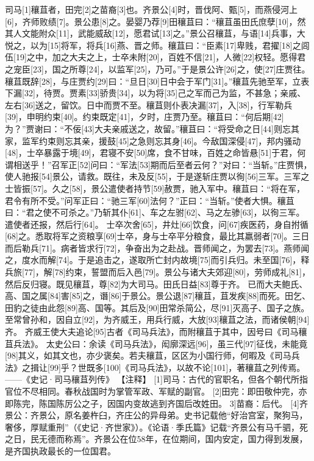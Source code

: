 \documentclass[12pt,UTF8]{ctexbook}
\begin{document}
司马[1]穰苴者，田完[2]之苗裔[3]也。齐景公[4]时，晋伐阿、甄[5]，而燕侵河上[6]，齐师败绩[7]。景公患[8]之。晏婴乃荐[9]田穰苴曰：“穰苴虽田氏庶孽[10]，然其人文能附众[11]，武能威敌[12]，愿君试[13]之。”景公召穰苴，与语[14]兵事，大悦之，以为[15]将军，将兵[16]燕、晋之师。穰苴曰：“臣素[17]卑贱，君擢[18]之闾伍[19]之中，加之大夫之上，士卒未附[20]，百姓不信[21]，人微[22]权轻。愿得君之宠臣[23]，国之所尊[24]，以监军[25]，乃可。”于是景公许[26]之，使[27]庄贾往。
穰苴既辞[28]，与庄贾约[29]曰：“旦日[30]日中会于军门[31]。”穰苴先驰至军，立表下漏[32]，待贾。贾素[33]骄贵[34]，以为将[35]己之军而己为监，不甚急；亲戚、左右[36]送之，留饮。日中而贾不至。穰苴则仆表决漏[37]，入[38]，行军勒兵[39]，申明约束[40]。约束既定[41]，夕时，庄贾乃至。穰苴曰：“何后期[42]为？”贾谢曰：“不佞[43]大夫亲戚送之，故留。”穰苴曰：“将受命之日[44]则忘其家，监军约束则忘其亲，援鼓[45]之急则忘其身[46]。今敌国深侵[47]，邦内骚动[48]，士卒暴露于境[49]，君寝不安[50]席，食不甘味，百姓之命皆悬[51]于君，何谓相送乎！”召军正[52]问曰：“军法[53]期而后至者云何？”对曰：“当斩。”庄贾惧，使人驰报[54]景公，请救。既往，未及反[55]，于是遂斩庄贾以徇[56]三军。三军之士皆振[57]。久之[58]，景公遣使者持节[59]赦贾，驰入军中。穰苴曰：“将在军，君令有所不受。”问军正曰：“驰三军[60]法何？”正曰：“当斩。”使者大惧。穰苴曰：“君之使不可杀之。”乃斩其仆[61]、车之左驸[62]、马之左骖[63]，以徇三军。遣使者还报，然后行[64]。
士卒次舍[65]，井灶[66]饮食，问[67]疾医药，身自拊循[68]之。悉取将军之资粮享[69]士卒，身与士卒平分粮食，最比其羸弱者[70]。三日而后勒兵[71]。病者皆求行[72]，争奋出为之赴战。晋师闻之，为罢去[73]。燕师闻之，度水而解[74]。于是追击之，遂取所亡封内故境[75]而引兵归。未至国[76]，释兵旅[77]，解[78]约束，誓盟而后入邑[79]。景公与诸大夫郊迎[80]，劳师成礼[81]，然后反归寝。既见穰苴，尊[82]为大司马。田氏日益[83]尊于齐。
已而大夫鲍氏、高、国之属[84]害[85]之，谮[86]于景公。景公退[87]穰苴，苴发疾[88]而死。田乞、田豹之徒由此怨[89]高、国等。其后及[90]田常杀简公，尽[91]灭高子、国子之族。至常曾孙和，因自立[92]，为齐威王，用兵行威，大放[93]穰苴之法，而诸侯朝[94]齐。
齐威王使大夫追论[95]古者《司马兵法》，而附穰苴于其中，因号曰《司马穰苴兵法》。
太史公曰：余读《司马兵法》，闳廓深远[96]，虽三代[97]征伐，未能竟[98]其义，如其文也，亦少褒矣。若夫穰苴，区区为小国行师，何暇及《司马兵法》之揖让[99]乎？世既多[100]《司马兵法》，以故不论[101]，著穰苴之列传焉。
——《史记·司马穰苴列传》
【注释】
[1]司马：古代的官职名，但各个朝代所指官位不尽相同。春秋战国时为掌管军政、军赋的副官。
[2]田完：即田敬仲完，亦即陈完，陈国陈厉公之子，因国内变故逃到齐国后改姓田。
3]苗裔：后代。
[4]齐景公：齐景公，原名姜杵臼，齐庄公的异母弟。史书记载他“好治宫室，聚狗马，奢侈，厚赋重刑”（《史记·齐世家》）。《论语·季氏篇》记载“齐景公有马千驷，死之日，民无德而称焉”。齐景公在位58年，在位期间，国内安定，国力得到发展，是齐国执政最长的一位国君。
\end{document}
